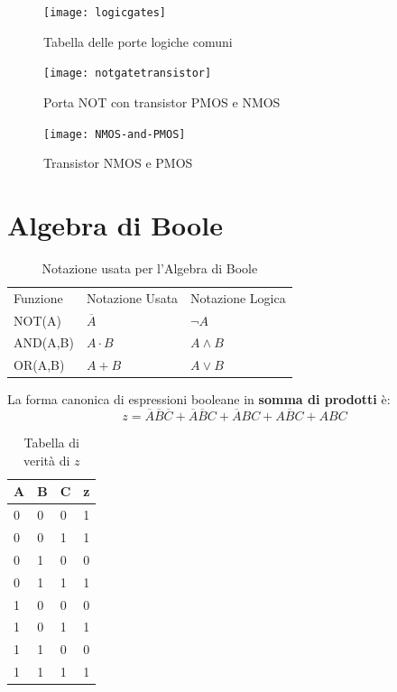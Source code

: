 \begin{figure}
	\centering
	\caption{Tabella delle porte logiche comuni}
	\texttt{[image: logicgates]}
\end{figure}

\begin{figure}
	\centering
	\caption{Porta NOT con transistor PMOS e NMOS}
	\texttt{[image: notgatetransistor]}
\end{figure}

\begin{figure}
	\centering
	\caption{Transistor NMOS e PMOS}
	\texttt{[image: NMOS-and-PMOS]}
\end{figure}

\clearpage



\section{Algebra di Boole}

\begin{table}[H]
	\centering
	\caption{Notazione usata per l'Algebra di Boole}
	\label{tab:notazione-booleana}
	\begin{tabular}{|l|l|l|}
		\hline
		Funzione & Notazione Usata & Notazione Logica \\ 
		NOT(A)   & $\overbar{A}$   & $\lnot A$        \\ 
		AND(A,B) & $A \cdot B$     & $A \land B$      \\ 
		OR(A,B)  & $A + B$         & $A \lor B$       \\ \hline
	\end{tabular}
\end{table}

La forma canonica di espressioni booleane in \textbf{somma di prodotti} è:
\[ z = \overbar{A}\overbar{B}\overbar{C} + \overbar{A}\overbar{B}C + \overbar{A}BC + A\overbar{B}C + ABC \]

\begin{table}[H]
	\centering
	\caption{Tabella di verità di $ z $}
	\label{tab:z-truth}
	\begin{tabular}{|l|l|l|l|}
		\hline
		A & B & C & z \\ \hline
		0                       & 0                      & 0 & 1 \\  
		0                       & 0                      & 1 & 1 \\ 
		0                       & 1                      & 0 & 0 \\ 
		0                       & 1                      & 1 & 1 \\ 
		1                       & 0                      & 0 & 0 \\ 
		1                       & 0                      & 1 & 1 \\  
		1                       & 1                      & 0 & 0 \\ 
		1                       & 1                      & 1 & 1 \\ \hline
	\end{tabular}
\end{table}

